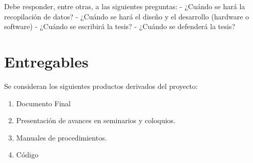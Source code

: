 Debe responder, entre otras, a las siguientes preguntas:
- ¿Cuándo se hará la recopilación de datos?
- ¿Cuándo se hará el diseño y el desarrollo (hardware o
software)
- ¿Cuándo se escribirá la tesis?
- ¿Cuándo se defenderá la tesis?

\section{Entregables}

    Se consideran los siguientes productos derivados del proyecto:
    
    \begin{enumerate}
        \item Documento Final
        \item Presentación de avances en seminarios y coloquios.
        \item Manuales de procedimientos.
        \item Código
    \end{enumerate}